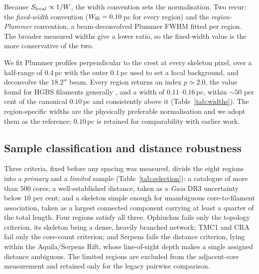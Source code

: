 \documentclass[usenatbib,twoside,twocolumn]{mnras}
\begin{document}
Because $S_{\rm local}\propto1/W$, the width convention sets the normalisation. Two recur: the \emph{fixed-width} convention ($W_{\rm fil}=0.10$\,pc for every region) and the \emph{region-Plummer} convention, a beam-deconvolved Plummer FWHM fitted per region. The broader measured widths give a lower ratio, so the fixed-width value is the more conservative of the two.

We fit Plummer profiles perpendicular to the crest at every skeleton pixel, over a half-range of $0.4$\,pc with the outer $0.1$\,pc used to set a local background, and deconvolve the $18.2''$ beam. Every region returns an index $p\simeq2.0$, the value found for HGBS filaments generally \citep{Arzoumanian2019}, and a width of $0.11$--$0.16$\,pc, within $\sim50$ per cent of the canonical $0.10$\,pc and consistently above it (Table~\ref{tab:widths}). The region-specific widths are the physically preferable normalisation and we adopt them as the reference; $0.10$\,pc is retained for comparability with earlier work.



\subsection{Sample classification and distance robustness}
\label{sec:distance_uncertainties}

Three criteria, fixed before any spacing was measured, divide the eight regions into a \emph{primary} and a \emph{limited} sample (Table~\ref{tab:selection}): a catalogue of more than $500$ cores; a well-established distance, taken as a \textit{Gaia} DR3 uncertainty below $10$ per cent; and a skeleton simple enough for unambiguous core-to-filament association, taken as a largest connected component carrying at least a quarter of the total length. Four regions satisfy all three. Ophiuchus fails only the topology criterion, its skeleton being a dense, heavily branched network; TMC1 and CRA fail only the core-count criterion; and Serpens fails the distance criterion, lying within the Aquila/Serpens Rift, whose line-of-sight depth makes a single assigned distance ambiguous. The limited regions are excluded from the adjacent-core measurement and retained only for the legacy pairwise comparison.
\end{document}
